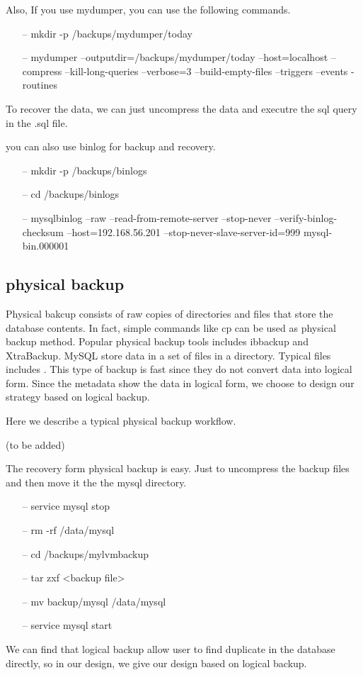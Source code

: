 Also, If you use mydumper, you can use the following commands.

\begin{itemize}
\item[--] mkdir -p /backups/mydumper/today
\item[--] mydumper --outputdir=/backups/mydumper/today --host=localhost --compress --kill-long-queries --verbose=3 --build-empty-files --triggers --events -routines 
\end{itemize}

 
To recover the data, we can just uncompress the data and executre the sql query in the .sql file. 

you can also use binlog for backup and recovery.

\begin{itemize}
\item[--] mkdir -p /backups/binlogs
\item[--] cd /backups/binlogs
\item[--] mysqlbinlog --raw --read-from-remote-server --stop-never --verify-binlog-checksum --host=192.168.56.201 --stop-never-slave-server-id=999 mysql-bin.000001
\end{itemize}


\subsection{physical backup}

Physical bakcup consists of raw copies of directories and files that store the database contents\citep{mysqlbackupdocumentation}. In fact, simple commands like cp can be used as physical backup method. Popular physical backup tools includes ibbackup and XtraBackup\citep{xtrabackup}. MySQL store data in a set of files in a directory. Typical files includes .
This type of backup is fast since they do not convert data into logical form. Since the metadata show the data in logical form, we choose to design our strategy based on logical backup. 


Here we describe a typical physical backup workflow. 

(to be added)

The recovery form physical backup is easy. Just to uncompress the backup files and then move it the the mysql directory. 


\begin{itemize}
\item[--] service mysql stop
\item[--] rm -rf /data/mysql
\item[--] cd /backups/mylvmbackup
\item[--] tar zxf <backup file>
\item[--] mv backup/mysql /data/mysql
\item[--] service mysql start
\end{itemize}


We can find that logical backup allow user to find duplicate in the database directly, so in our design, we give our design based on logical backup.



